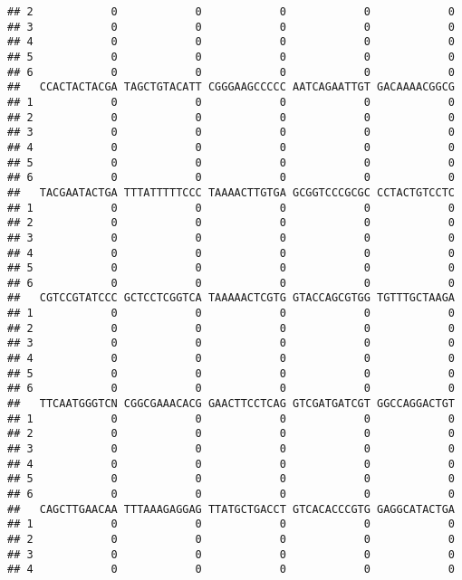 \documentclass[]{article}
\begin{document}
\begin{verbatim}
## 2            0            0            0            0            0
## 3            0            0            0            0            0
## 4            0            0            0            0            0
## 5            0            0            0            0            0
## 6            0            0            0            0            0
##   CCACTACTACGA TAGCTGTACATT CGGGAAGCCCCC AATCAGAATTGT GACAAAACGGCG
## 1            0            0            0            0            0
## 2            0            0            0            0            0
## 3            0            0            0            0            0
## 4            0            0            0            0            0
## 5            0            0            0            0            0
## 6            0            0            0            0            0
##   TACGAATACTGA TTTATTTTTCCC TAAAACTTGTGA GCGGTCCCGCGC CCTACTGTCCTC
## 1            0            0            0            0            0
## 2            0            0            0            0            0
## 3            0            0            0            0            0
## 4            0            0            0            0            0
## 5            0            0            0            0            0
## 6            0            0            0            0            0
##   CGTCCGTATCCC GCTCCTCGGTCA TAAAAACTCGTG GTACCAGCGTGG TGTTTGCTAAGA
## 1            0            0            0            0            0
## 2            0            0            0            0            0
## 3            0            0            0            0            0
## 4            0            0            0            0            0
## 5            0            0            0            0            0
## 6            0            0            0            0            0
##   TTCAATGGGTCN CGGCGAAACACG GAACTTCCTCAG GTCGATGATCGT GGCCAGGACTGT
## 1            0            0            0            0            0
## 2            0            0            0            0            0
## 3            0            0            0            0            0
## 4            0            0            0            0            0
## 5            0            0            0            0            0
## 6            0            0            0            0            0
##   CAGCTTGAACAA TTTAAAGAGGAG TTATGCTGACCT GTCACACCCGTG GAGGCATACTGA
## 1            0            0            0            0            0
## 2            0            0            0            0            0
## 3            0            0            0            0            0
## 4            0            0            0            0            0

\end{verbatim}
\end{document}
